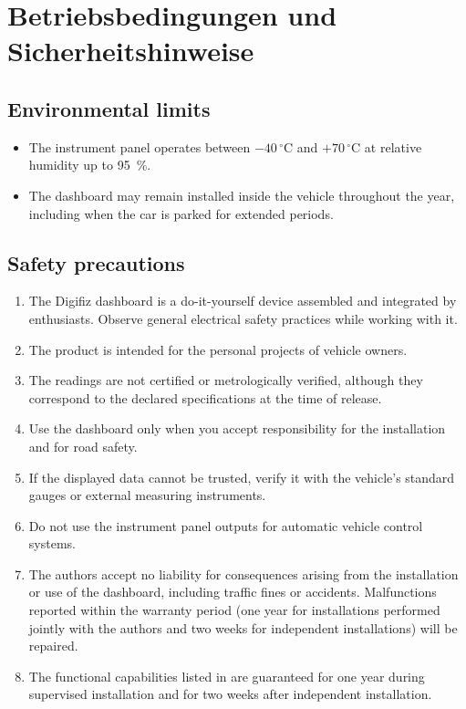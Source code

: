 \chapter{Betriebsbedingungen und Sicherheitshinweise}\label{ch:safety}

\section{Environmental limits}
\begin{itemize}
    \item The instrument panel operates between \(-40\,^{\circ}\mathrm{C}\) and \(+70\,^{\circ}\mathrm{C}\) at relative humidity up to 95~\%.
    \item The dashboard may remain installed inside the vehicle throughout the year, including when the car is parked for extended periods.
\end{itemize}

\section{Safety precautions}
\begin{enumerate}
    \item The Digifiz dashboard is a do-it-yourself device assembled and integrated by enthusiasts. Observe general electrical safety practices while working with it.
    \item The product is intended for the personal projects of vehicle owners.
    \item The readings are not certified or metrologically verified, although they correspond to the declared specifications at the time of release.
    \item Use the dashboard only when you accept responsibility for the installation and for road safety.
    \item If the displayed data cannot be trusted, verify it with the vehicle's standard gauges or external measuring instruments.
    \item Do not use the instrument panel outputs for automatic vehicle control systems.
    \item The authors accept no liability for consequences arising from the installation or use of the dashboard, including traffic fines or accidents. Malfunctions reported within the warranty period (one year for installations performed jointly with the authors and two weeks for independent installations) will be repaired.
    \item The functional capabilities listed in  are guaranteed for one year during supervised installation and for two weeks after independent installation.
\end{enumerate}

